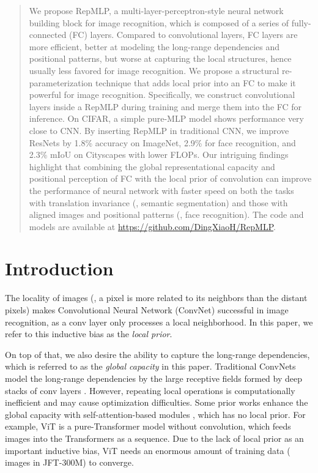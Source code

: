 \documentclass[10pt,twocolumn,letterpaper]{article}
\begin{document}
\begin{abstract} 
	We propose RepMLP, a multi-layer-perceptron-style neural network building block for image recognition, which is composed of a series of fully-connected (FC) layers. Compared to convolutional layers, FC layers are more efficient, better at modeling the long-range dependencies and positional patterns, but worse at capturing the local structures, hence usually less favored for image recognition. We propose a structural re-parameterization technique that adds local prior into an FC to make it powerful for image recognition. Specifically, we construct convolutional layers inside a RepMLP during training and merge them into the FC for inference. On CIFAR, a simple pure-MLP model shows performance very close to CNN. By inserting RepMLP in traditional CNN, we improve ResNets by 1.8\% accuracy on ImageNet, 2.9\% for face recognition, and 2.3\% mIoU on Cityscapes with lower FLOPs. Our intriguing findings highlight that combining the global representational capacity and positional perception of FC with the local prior of convolution can improve the performance of neural network with faster speed on both the tasks with translation invariance (\eg, semantic segmentation) and those with aligned images and positional patterns (\eg, face recognition). The code and models are available at \url{https://github.com/DingXiaoH/RepMLP}.
\end{abstract}




\section{Introduction}

The locality of images (\ie, a pixel is more related to its neighbors than the distant pixels) makes Convolutional Neural Network (ConvNet) successful in image recognition, as a conv layer only processes a local neighborhood. In this paper, we refer to this inductive bias as the \textit{local prior}.

On top of that, we also desire the ability to capture the long-range dependencies, which is referred to as the \textit{global capacity} in this paper. Traditional ConvNets model the long-range dependencies by the large receptive fields formed by deep stacks of conv layers \cite{wang2018non}. However, repeating local operations is computationally inefficient and may cause optimization difficulties. Some prior works enhance the global capacity with self-attention-based modules \cite{wang2018non,dosovitskiy2020image,vaswani2017attention}, which has no local prior. For example, ViT \cite{dosovitskiy2020image} is a pure-Transformer model without convolution, which feeds images into the Transformers as a sequence. Due to the lack of local prior as an important inductive bias, ViT needs an enormous amount of training data ( images in JFT-300M) to converge.
\end{document}
